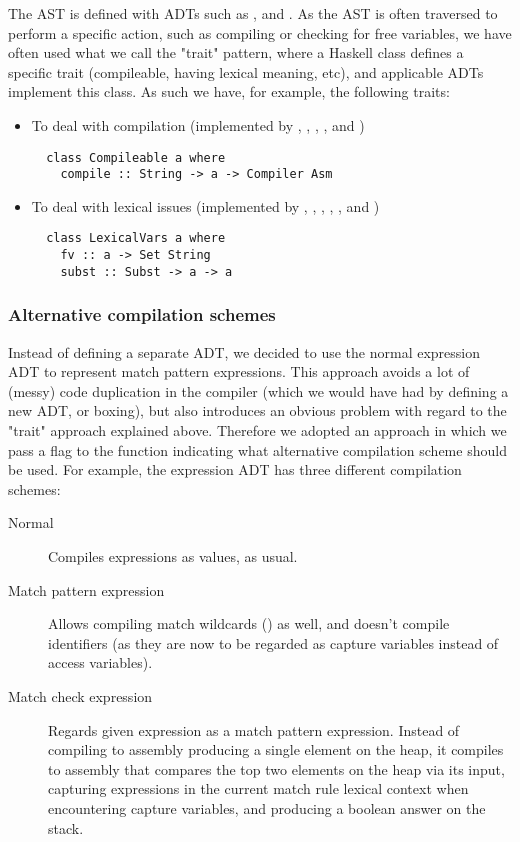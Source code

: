 \documentclass[english,10pt]{article} %
\theoremstyle{definitionstyle}
\theoremstyle{lemmastyle}
\begin{document}
The AST is defined with ADTs such as ,  and . As the AST is often traversed to perform a specific action, such as compiling or checking for free variables, we have often used what we call the "trait" pattern, where a Haskell class defines a specific trait (compileable, having lexical meaning, etc), and applicable ADTs implement this class. As such we have, for example, the following traits:

\begin{itemize}
\item To deal with compilation (implemented by , , , ,  and )
  \begin{verbatim}
  class Compileable a where
    compile :: String -> a -> Compiler Asm
  \end{verbatim}
\item To deal with lexical issues (implemented by , , , , ,  and )
  \begin{verbatim}
  class LexicalVars a where
    fv :: a -> Set String
    subst :: Subst -> a -> a
  \end{verbatim}
\end{itemize}

\subsubsection{Alternative compilation schemes}

Instead of defining a separate ADT, we decided to use the normal expression ADT to represent match pattern expressions. This approach avoids a lot of (messy) code duplication in the compiler (which we would have had by defining a new ADT, or boxing), but also introduces an obvious problem with regard to the "trait" approach explained above. Therefore we adopted an approach in which we pass a flag to the  function indicating what alternative compilation scheme should be used. For example, the expression ADT has three different compilation schemes:
\begin{description}
\item[Normal] Compiles expressions as values, as usual.
\item[Match pattern expression] Allows compiling match wildcards (\lit*{_}) as well, and doesn't compile identifiers (as they are now to be regarded as capture variables instead of access variables).
\item[Match check expression] Regards given expression as a match pattern expression. Instead of compiling to assembly producing a single element on the heap, it compiles to assembly that compares the top two elements on the heap via its input, capturing expressions in the current match rule lexical context when encountering capture variables, and producing a boolean answer on the stack.
\end{description}
\end{document}
